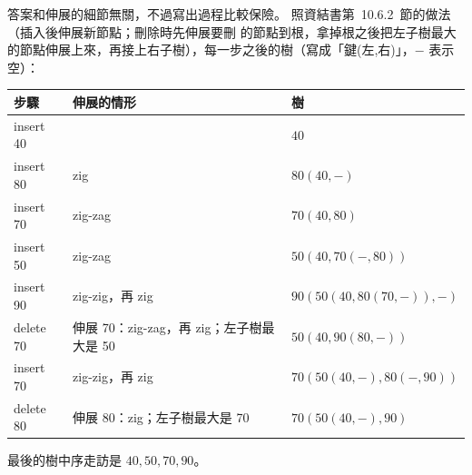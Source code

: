 \begin{pastsoln}
答案和伸展的細節無關，不過寫出過程比較保險。 照資結書第~10.6.2~節的做法（插入後伸展新節點；刪除時先伸展要刪
的節點到根，拿掉根之後把左子樹最大的節點伸展上來，再接上右子樹），每一步之後的樹（寫成「鍵(左,右)」，$-$ 表示空）：
\begin{center}
\begin{tabular}{lll}
\toprule
步驟 & 伸展的情形 & 樹 \\
\midrule
insert 40 & & $40$ \\
insert 80 & zig & $80(40,-)$ \\
insert 70 & zig-zag & $70(40, 80)$ \\
insert 50 & zig-zag & $50(40, 70(-, 80))$ \\
insert 90 & zig-zig，再 zig & $90(50(40, 80(70,-)), -)$ \\
delete 70 & 伸展 70：zig-zag，再 zig；左子樹最大是 50 & $50(40, 90(80, -))$ \\
insert 70 & zig-zig，再 zig & $70(50(40,-), 80(-, 90))$ \\
delete 80 & 伸展 80：zig；左子樹最大是 70 & $70(50(40,-), 90)$ \\
\bottomrule
\end{tabular}
\end{center}
最後的樹中序走訪是 $40, 50, 70, 90$。
\end{pastsoln}
